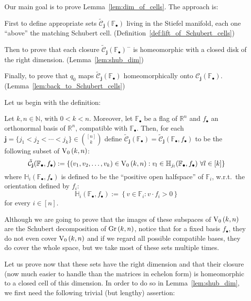 Our main goal is to prove Lemma~\ref{lem:dim_of_cells}. The approach is:
\begin{i_enum}
\item First to define appropriate sets $\tilde{\mathcal{C}}_{\mathbf{j}}(\mathbb{F}_{\bullet})$ living in the Stiefel manifold, each one ``above'' the matching Schubert cell. (Definition~\ref{def:lift_of_Schubert_cells})
\item Then to prove that each closure $\tilde{\mathcal{C}}_{\mathbf{j}}{\left(\mathbb{F}_{\bullet}\right)}^-$ is homeomorphic with a closed disk of the right dimension. (Lemma~\ref{lem:shub_dim})
\item Finally, to prove that $q_0$ maps $\tilde{\mathcal{C}}_{\mathbf{j}}(\mathbb{F}_{\bullet})$ homeomorphically onto $\mathcal{C}_{\mathbf{j}}(\mathbb{F}_{\bullet})$. (Lemma~\ref{lem:back_to_Schubert_cells})
\end{i_enum}
Let us begin with the definition:

\begin{definition}\label{def:lift_of_Schubert_cells} Let $k,n\in\mathbb{N}$, with $0<k<n$. Moreover, let $\mathbb{F}_{\bullet}$ be a flag of $\mathbb{R}^n$ and $f_{\bullet}$ an orthonormal basis of $\mathbb{R}^n$, compatible with $\mathbb{F}_{\bullet}$. Then, for each $\mathbf{j}=\{j_1<j_2<\cdots<j_k\}\in\binom{[n]}{k}$ define $\tilde{\mathcal{C}}_{\mathbf{j}}(\mathbb{F}_{\bullet})=\tilde{\mathcal{C}}_{\mathbf{j}}(\mathbb{F}_{\bullet},f_{\bullet})$ to be the following subset of $\StO{k}{n}$:
\[\tilde{\mathcal{C}}_{\mathbf{j}}(\mathbb{F}_{\bullet},f_{\bullet}):=\left\{(v_1,v_2,\ldots,v_k)\in\StO{k}{n}:v_l\in\mathbb{H}_{j_l}(\mathbb{F}_{\bullet},f_{\bullet})\ \forall l\in[k]\right\}\]
where $\mathbb{H}_i(\mathbb{F}_{\bullet},f_{\bullet})$ is defined to be the ``positive open halfspace'' of $\mathbb{F}_{i}$, w.r.t.\ the orientation defined by $f_i$:
\[\mathbb{H}_i(\mathbb{F}_{\bullet},f_{\bullet}):=\left\{v\in\mathbb{F}_i:v\cdot f_i>0\right\}\]
for every $i\in[n]$.
\end{definition}

Although we are going to prove that the images of these subspaces of $\StO{k}{n}$ are the Schubert decomposition of $\Gr{k}{n}$, notice that for a fixed basis $f_{\bullet}$, they do not even cover $\StO{k}{n}$ and if we regard all possible compatible bases, they do cover the whole space, but we take most of these sets multiple times.

Let us prove now that these sets have the right dimension and that their closure (now much easier to handle than the matrices in echelon form) is homeomorphic to a closed cell of this dimension. In order to do so in Lemma~\ref{lem:shub_dim}, we first need the following trivial (but lengthy) assertion:

